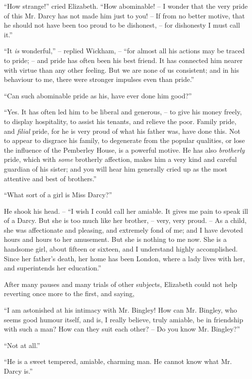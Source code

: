 “How strange!” cried Elizabeth. “How abominable! -- I
wonder that the very pride of this Mr. Darcy
has not made him just to you! -- If from no better motive,
that he should not have been too proud to be dishonest, -- for
dishonesty I must call it.”

“It \textit{is} wonderful,” -- replied Wickham, -- “for almost
all his actions may be traced to pride; -- and pride has
often been his best friend. It has connected him nearer
with virtue than any other feeling. But we are none of
us consistent; and in his behaviour to me, there were
stronger impulses even than pride.”

“Can such abominable pride as his, have ever done
him good?”

“Yes. It has often led him to be liberal and generous, -- to
give his money freely, to display hospitality, to assist
his tenants, and relieve the poor. Family pride, and \textit{filial}
pride, for he is very proud of what his father was, have
done this. Not to appear to disgrace his family, to degenerate
from the popular qualities, or lose the influence of the
Pemberley House, is a powerful motive. He has also
\textit{brotherly} pride, which with \textit{some} brotherly affection, makes
him a very kind and careful guardian of his sister; and you
will hear him generally cried up as the most attentive and
best of brothers.”

“What sort of a girl is Miss Darcy?”

He shook his head. -- “I wish I could call her amiable.
It gives me pain to speak ill of a Darcy. But she is too
much like her brother, -- very, very proud. -- As a child,
she was affectionate and pleasing, and extremely fond of
me; and I have devoted hours and hours to her amusement.
But she is nothing to me now. She is a handsome
girl, about fifteen or sixteen, and I understand highly
accomplished. Since her father’s death, her home has
been London, where a lady lives with her, and superintends
her education.”

After many pauses and many trials of other subjects,
Elizabeth could not help reverting once more to the first,
and saying,

“I am astonished at his intimacy with Mr. Bingley!
How can Mr. Bingley, who seems good humour itself, and
is, I really believe, truly amiable, be in friendship with
such a man? How can they suit each other? -- Do you
know Mr. Bingley?”

“Not at all.”

“He is a sweet tempered, amiable, charming man.
He cannot know what Mr. Darcy is.”

